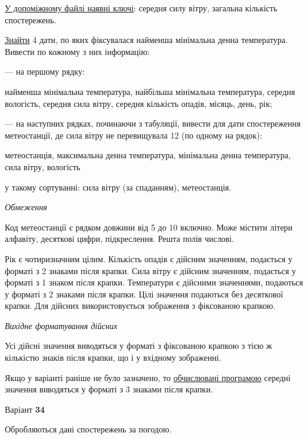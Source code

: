 \documentclass[11pt, ukrainian]{article}
\begin{document}
\underline{У допоміжному файлі наявні ключі}: середня силу вітру, загальна кількість спостережень.

\underline{Знайти} 4 дати, по яких фіксувалася найменша мінімальна  денна температура. Вивести по кожному з них інформацію:\par
{\noindent}--- на першому рядку:\par
найменша мінімальна температура, найбільша мінімальна температура, середня вологість, середня сила вітру, середня кількість опадів, місяць, день, рік;

{\noindent}--- на наступних рядках, починаючи з табуляції, вивести для дати спостереження метеостанції, де сила вітру не перевищувала 12 (по одному на рядок):\par
метеостанція, максимальна денна температура, мінімальна денна температура, сила вітру, вологість

{\noindent}у такому сортуванні: сила вітру (за спаданням), метеостанція.


\bigskip\textit{Обмеження}

Код метеостанції є рядком довжини від 5 до 10 включно.
Може містити літери алфавіту, десяткові цифри, підкреслення. Решта полів числові.

Рік є чотиризначним цілим.
Кількість опадів є дійсним значенням, подається у форматі з 2 знаками після крапки.
Сила вітру є дійсним значенням, подається у форматі з 1 знаком після крапки.
Температури є дійсними значеннями, подаються у форматі з 2 знаками після крапки.
Цілі значення подаються без десяткової крапки.
Для дійсних використовується зображення з фіксованою крапкою.

\textit{Вихідне форматування дійсних}

Усі дійсні значення виводяться у форматі з фіксованою крапкою з тією ж кількістю знаків після крапки, що і у вхідному зображенні.

Якщо у варіанті раніше не було зазначено, то \underline{обчислювані програмою} середні значення виводяться у форматі з 3 знаками після крапки.




\par
\newpage
{\center Варіант  \No \textbf { 34 }\par}
\bigskip
Обробляються дані спостережень за погодою. 
\end{document}
